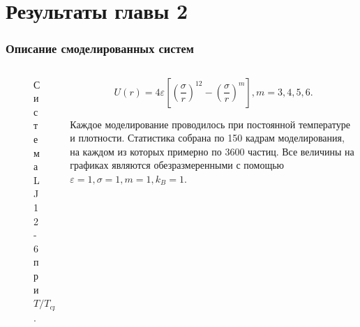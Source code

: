 \documentclass[pdf,hyperref={unicode}]{beamer}
\begin{document}
\section{Результаты главы 2}


\begin{frame}
\transdissolve[duration=0.2]
\frametitle{Описание смоделированных систем}

\begin{columns}

\begin{column}{0.45\linewidth}
\begin{figure}[h]

\caption{\tiny Система LJ 12-6 при $T / T_{cp} = 0.95$.}
\end{figure}
\end{column}

\begin{column}{0.5\linewidth}
\tiny{

\begin{equation}
U(r) = 4\varepsilon \left[ \left(\frac{\sigma}{r}\right)^{12} - \left(\frac{\sigma}{r}\right)^{m} \right], m = 3, 4, 5, 6.
\label{eqLJ}
\end{equation}

Каждое моделирование проводилось при постоянной температуре и плотности. Статистика собрана по 150 кадрам моделирования, на каждом из которых примерно по 3600 частиц. Все величины на графиках являются обезразмеренными с помощью $\varepsilon = 1, \sigma = 1, m = 1, k_B = 1$.

}
\end{column}
\end{columns}
\end{frame}
\end{document}
